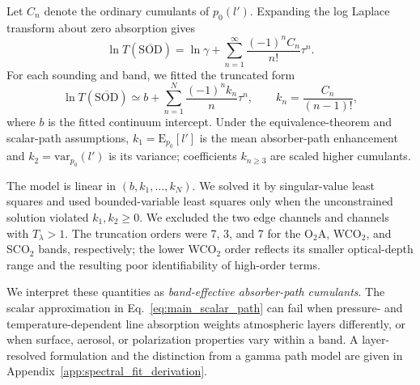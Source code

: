 Let $C_n$ denote the ordinary cumulants of $p_0(l')$.  Expanding the log
Laplace transform about zero absorption gives
\begin{equation}
  \ln T(\mathrm{\overline{SOD}})
  = \ln\gamma
    + \sum_{n=1}^{\infty}
      \frac{(-1)^n C_n}{n!}\tau^n.
  \label{eq:main_cumulant}
\end{equation}
For each sounding and band, we fitted the truncated form
\begin{equation}
  \ln T(\mathrm{\overline{SOD}})
  \simeq b
    + \sum_{n=1}^{N}
      \frac{(-1)^n k_n}{n}\tau^n,
  \qquad
  k_n=\frac{C_n}{(n-1)!},
  \label{eq:main_fit}
\end{equation}
where $b$ is the fitted continuum intercept.  Under the equivalence-theorem and
scalar-path assumptions, $k_1=\mathrm{E}_{p_0}[l']$ is the mean absorber-path
enhancement and $k_2=\mathrm{var}_{p_0}(l')$ is its variance; coefficients
$k_{n\geq3}$ are scaled higher cumulants.

The model is linear in $(b,k_1,\ldots,k_N)$.  We solved it by singular-value
least squares and used bounded-variable least squares only when the
unconstrained solution violated $k_1,k_2\geq0$.  We excluded the two edge
channels and channels with $T_\lambda>1$.  The truncation orders were 7, 3, and
7 for the O$_2$A, WCO$_2$, and SCO$_2$ bands, respectively; the lower
WCO$_2$ order reflects its smaller optical-depth range and the resulting
poor identifiability of high-order terms. 

We interpret these quantities as \emph{band-effective absorber-path cumulants}.
The scalar approximation in Eq.~\eqref{eq:main_scalar_path} can fail when
pressure- and temperature-dependent line absorption weights atmospheric layers
differently, or when surface, aerosol, or polarization properties vary within a
band.  A layer-resolved formulation and the distinction from a gamma path model
are given in Appendix~\ref{app:spectral_fit_derivation}.












